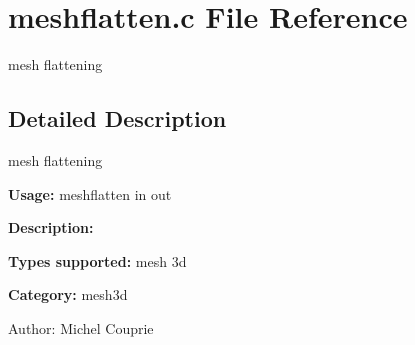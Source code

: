 \section{meshflatten.c File Reference}
\label{meshflatten_8c}
mesh flattening 



\subsection{Detailed Description}
mesh flattening 

{\bf Usage:} meshflatten in out

{\bf Description:}

{\bf Types supported:} mesh 3d

{\bf Category:} mesh3d

\begin{Desc}
\item[Author:]Michel Couprie \end{Desc}
